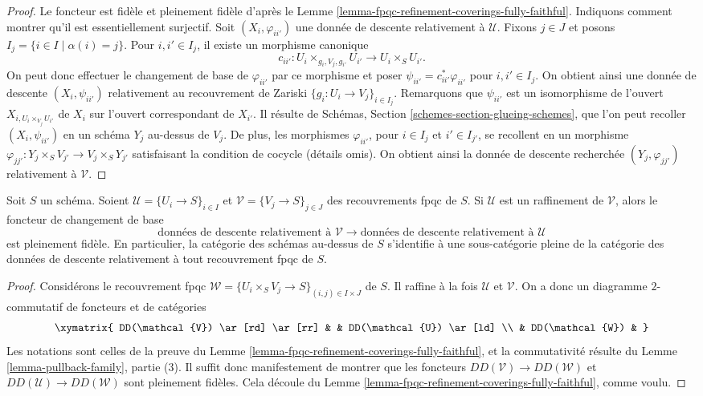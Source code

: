 \begin{proof}
Le foncteur est fidèle et pleinement fidèle d'après le
Lemme \ref{lemma-fpqc-refinement-coverings-fully-faithful}.
Indiquons comment montrer qu'il est essentiellement surjectif.
Soit $(X_i, \varphi_{ii'})$ une donnée de descente relativement à
$\mathcal{U}$. Fixons $j \in J$ et posons
$I_j = \{i \in I \mid \alpha(i) = j\}$. Pour $i, i' \in I_j$, il existe un
morphisme canonique
$$
c_{ii'} : U_i \times_{g_i, V_j, g_{i'}} U_{i'} \to U_i \times_S U_{i'}.
$$
On peut donc effectuer le changement de base de $\varphi_{ii'}$ par ce
morphisme et poser $\psi_{ii'} = c_{ii'}^*\varphi_{ii'}$ pour
$i, i' \in I_j$. On obtient ainsi une donnée de descente
$(X_i, \psi_{ii'})$ relativement au recouvrement de Zariski
$\{g_i : U_i \to V_j\}_{i \in I_j}$. Remarquons que $\psi_{ii'}$ est un
isomorphisme de l'ouvert $X_{i, U_i \times_{V_j} U_{i'}}$ de $X_i$ sur
l'ouvert correspondant de $X_{i'}$. Il résulte de Schémas,
Section \ref{schemes-section-glueing-schemes}, que l'on peut recoller
$(X_i, \psi_{ii'})$ en un schéma $Y_j$ au-dessus de $V_j$. De plus, les
morphismes $\varphi_{ii'}$, pour $i \in I_j$ et $i' \in I_{j'}$, se
recollent en un morphisme
$\varphi_{jj'} : Y_j \times_S V_{j'} \to V_j \times_S Y_{j'}$ satisfaisant
la condition de cocycle (détails omis). On obtient ainsi la donnée de descente
recherchée $(Y_j, \varphi_{jj'})$ relativement à $\mathcal{V}$.
\end{proof}

\begin{lemma}
\label{lemma-refine-coverings-fully-faithful}
Soit $S$ un schéma. Soient
$\mathcal{U} = \{U_i \to S\}_{i \in I}$ et
$\mathcal{V} = \{V_j \to S\}_{j \in J}$ des recouvrements fpqc de $S$.
Si $\mathcal{U}$ est un raffinement de $\mathcal{V}$, alors le foncteur de
changement de base
$$
\text{données de descente relativement à }
\mathcal{V}
\longrightarrow
\text{données de descente relativement à }
\mathcal{U}
$$
est pleinement fidèle. En particulier, la catégorie des schémas au-dessus de
$S$ s'identifie à une sous-catégorie pleine de la catégorie des données de
descente relativement à tout recouvrement fpqc de $S$.
\end{lemma}

\begin{proof}
Considérons le recouvrement fpqc
$\mathcal{W} = \{U_i \times_S V_j \to S\}_{(i, j) \in I \times J}$ de $S$.
Il raffine à la fois $\mathcal{U}$ et $\mathcal{V}$. On a donc un diagramme
$2$-commutatif de foncteurs et de catégories
$$
\xymatrix{
DD(\mathcal{V}) \ar[rd] \ar[rr] & & DD(\mathcal{U}) \ar[ld] \\
& DD(\mathcal{W}) &
}
$$
Les notations sont celles de la preuve du
Lemme \ref{lemma-fpqc-refinement-coverings-fully-faithful}, et la
commutativité résulte du Lemme \ref{lemma-pullback-family}, partie (3).
Il suffit donc manifestement de montrer que les foncteurs
$DD(\mathcal{V}) \to DD(\mathcal{W})$ et
$DD(\mathcal{U}) \to DD(\mathcal{W})$ sont pleinement fidèles. Cela découle
du Lemme \ref{lemma-fpqc-refinement-coverings-fully-faithful}, comme voulu.
\end{proof}


